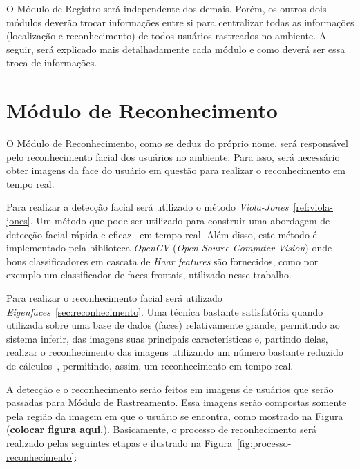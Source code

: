 
O Módulo de Registro será independente dos demais. Porém, os outros dois módulos deverão trocar informações entre si para centralizar todas as informações (localização e reconhecimento) de todos usuários rastreados no ambiente. A seguir, será explicado mais detalhadamente cada módulo e como deverá ser essa troca de informações.

\section{Módulo de Reconhecimento}

	O Módulo de Reconhecimento, como se deduz do próprio nome, será responsável pelo reconhecimento facial dos usuários no ambiente. Para isso, será necessário obter imagens da face do usuário em questão para realizar o reconhecimento em tempo real. 

	Para realizar a detecção facial será utilizado o método \textit{Viola-Jones}~\ref{ref:viola-jones}. Um método que pode ser utilizado para construir uma abordagem de detecção facial rápida e eficaz~\cite{violajones} em tempo real. Além disso, este método é implementado pela biblioteca \textit{OpenCV} (\textit{Open Source Computer Vision}) onde bons classificadores em cascata de \textit{Haar features} são fornecidos, como por exemplo um classificador de faces frontais, utilizado nesse trabalho.

	Para realizar o reconhecimento facial será utilizado \textit{Eigenfaces}~\ref{sec:reconhecimento}. Uma técnica bastante satisfatória quando utilizada sobre uma base de dados (faces) relativamente grande, permitindo ao sistema inferir, das imagens suas principais características e, partindo delas, realizar o reconhecimento das imagens utilizando um número bastante reduzido de cálculos~\cite{artigo-eigenface}, permitindo, assim, um reconhecimento em tempo real.

	A detecção e o reconhecimento serão feitos em imagens de usuários que serão passadas para Módulo de Rastreamento. Essa imagens serão compostas somente pela região da imagem em que o usuário se encontra, como mostrado na Figura (\textbf{colocar figura aqui.}). Basicamente, o processo de reconhecimento será realizado pelas seguintes etapas e ilustrado na Figura~\ref{fig:processo-reconhecimento}:

